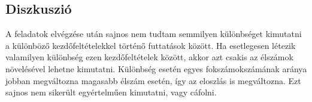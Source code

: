 \subsection{Diszkuszió} \label{sub:2.3}
A feladatok elvégzése után sajnos nem tudtam semmilyen különbséget kimutatni a különböző kezdőfeltételekkel történő futtatások között. Ha esetlegesen létezik valamilyen különbség ezen kezdőfeltételek között, akkor azt csakis az élszámok növelésével lehetne kimutatni. Különbség esetén egyes fokszámokszámának aránya jobban megváltozna magasabb élszám esetén, így az eloszlás is megváltozna. Ezt sajnos nem sikerült egyértelműen kimutatni, vagy cáfolni.